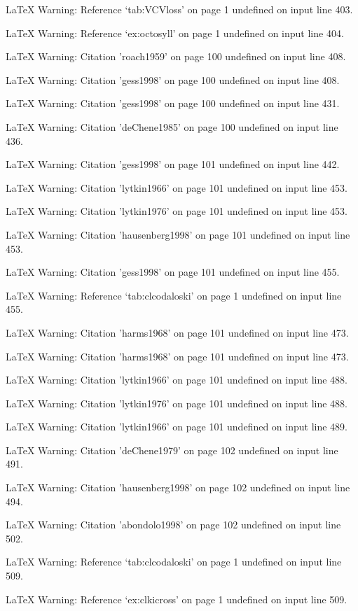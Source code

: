 LaTeX Warning: Reference `tab:VCVloss' on page 1 undefined on input line 403.


LaTeX Warning: Reference `ex:octosyll' on page 1 undefined on input line 404.


LaTeX Warning: Citation 'roach1959' on page 100 undefined on input line 408.


LaTeX Warning: Citation 'gess1998' on page 100 undefined on input line 408.


LaTeX Warning: Citation 'gess1998' on page 100 undefined on input line 431.


LaTeX Warning: Citation 'deChene1985' on page 100 undefined on input line 436.


LaTeX Warning: Citation 'gess1998' on page 101 undefined on input line 442.


LaTeX Warning: Citation 'lytkin1966' on page 101 undefined on input line 453.


LaTeX Warning: Citation 'lytkin1976' on page 101 undefined on input line 453.


LaTeX Warning: Citation 'hausenberg1998' on page 101 undefined on input line 453.


LaTeX Warning: Citation 'gess1998' on page 101 undefined on input line 455.


LaTeX Warning: Reference `tab:clcodaloski' on page 1 undefined on input line 455.


LaTeX Warning: Citation 'harms1968' on page 101 undefined on input line 473.


LaTeX Warning: Citation 'harms1968' on page 101 undefined on input line 473.


LaTeX Warning: Citation 'lytkin1966' on page 101 undefined on input line 488.


LaTeX Warning: Citation 'lytkin1976' on page 101 undefined on input line 488.


LaTeX Warning: Citation 'lytkin1966' on page 101 undefined on input line 489.


LaTeX Warning: Citation 'deChene1979' on page 102 undefined on input line 491.


LaTeX Warning: Citation 'hausenberg1998' on page 102 undefined on input line 494.


LaTeX Warning: Citation 'abondolo1998' on page 102 undefined on input line 502.


LaTeX Warning: Reference `tab:clcodaloski' on page 1 undefined on input line 509.


LaTeX Warning: Reference `ex:clkicross' on page 1 undefined on input line 509.



